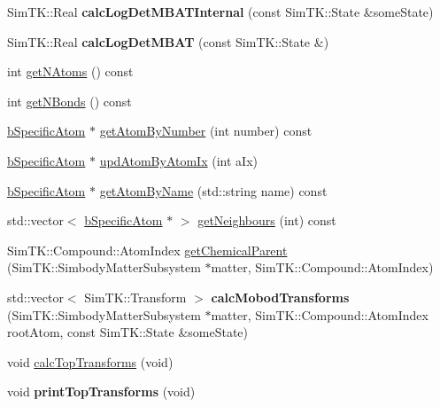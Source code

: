 \begin{DoxyCompactItemize}
\item 
Sim\+T\+K\+::\+Real {\bfseries calc\+Log\+Det\+M\+B\+A\+T\+Internal} (const Sim\+T\+K\+::\+State \&some\+State)\hypertarget{classTopology_ade491b23d6e41abbc84e809be14cd543}{}\label{classTopology_ade491b23d6e41abbc84e809be14cd543}

\item 
Sim\+T\+K\+::\+Real {\bfseries calc\+Log\+Det\+M\+B\+AT} (const Sim\+T\+K\+::\+State \&)\hypertarget{classTopology_a975172cc0f81baad15f67900b6fc517d}{}\label{classTopology_a975172cc0f81baad15f67900b6fc517d}

\item 
int \hyperlink{classTopology_a1725652fdbf27bcbda7e16c07bddc7b1}{get\+N\+Atoms} () const 
\item 
int \hyperlink{classTopology_aae1c39ba234dfa5df80a46f8009cd164}{get\+N\+Bonds} () const 
\item 
\hyperlink{classbSpecificAtom}{b\+Specific\+Atom} $\ast$ \hyperlink{classTopology_a5733e1f7ab0c145a05fdb9650d0d015a}{get\+Atom\+By\+Number} (int number) const 
\item 
\hyperlink{classbSpecificAtom}{b\+Specific\+Atom} $\ast$ \hyperlink{classTopology_a85f201c9fbb2164e57a13b2500b3a166}{upd\+Atom\+By\+Atom\+Ix} (int a\+Ix)
\item 
\hyperlink{classbSpecificAtom}{b\+Specific\+Atom} $\ast$ \hyperlink{classTopology_a87a161d4a1260c148eecc46682a1c664}{get\+Atom\+By\+Name} (std\+::string name) const 
\item 
std\+::vector$<$ \hyperlink{classbSpecificAtom}{b\+Specific\+Atom} $\ast$ $>$ \hyperlink{classTopology_ae1e1834b0011f578fc98a82fb544054b}{get\+Neighbours} (int) const 
\item 
Sim\+T\+K\+::\+Compound\+::\+Atom\+Index \hyperlink{classTopology_a0ce3bb644b6420d011b34b77ecb8567f}{get\+Chemical\+Parent} (Sim\+T\+K\+::\+Simbody\+Matter\+Subsystem $\ast$matter, Sim\+T\+K\+::\+Compound\+::\+Atom\+Index)
\item 
std\+::vector$<$ Sim\+T\+K\+::\+Transform $>$ {\bfseries calc\+Mobod\+Transforms} (Sim\+T\+K\+::\+Simbody\+Matter\+Subsystem $\ast$matter, Sim\+T\+K\+::\+Compound\+::\+Atom\+Index root\+Atom, const Sim\+T\+K\+::\+State \&some\+State)\hypertarget{classTopology_a685282e19f5f256a01edfbd295ea4e4b}{}\label{classTopology_a685282e19f5f256a01edfbd295ea4e4b}

\item 
void \hyperlink{classTopology_a4ed164b1fe5ece6e00a841bffe1861fa}{calc\+Top\+Transforms} (void)
\item 
void {\bfseries print\+Top\+Transforms} (void)\hypertarget{classTopology_a7108a6b3cdf56149fe38e1069f3e335c}{}\label{classTopology_a7108a6b3cdf56149fe38e1069f3e335c}


\end{DoxyCompactItemize}
